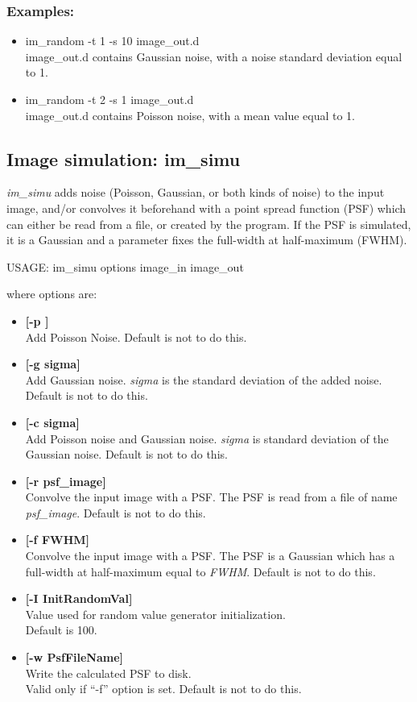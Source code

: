 \subsubsection*{Examples:}
\begin{itemize}
\item im\_random  -t 1 -s 10 image\_out.d  \\
image\_out.d contains Gaussian noise, with a noise standard 
deviation equal to 1.
\item im\_random  -t 2 -s 1 image\_out.d  \\
image\_out.d contains Poisson noise, with a mean value equal to 1.
\end{itemize}

\subsection{Image simulation: im\_simu}

{\em im\_simu} adds noise (Poisson, Gaussian, or both kinds of noise)
to the input image, and/or convolves it beforehand with a 
point spread function (PSF)
which can either be read from a file, or created by the program.
If the PSF is simulated, it is a Gaussian and a parameter fixes the
full-width at half-maximum (FWHM). 
{\bf
\begin{center}
USAGE: im\_simu options image\_in image\_out
\end{center}}
where options are:
\begin{itemize}
\item {\bf[-p ]} \\
Add Poisson Noise. Default is not to do this.
\item{\bf [-g sigma]} \\
Add Gaussian noise. {\em sigma} is the standard 
deviation of the added noise. Default is not to do this.
\item{\bf [-c sigma]} \\
Add Poisson noise and Gaussian noise. 
{\em sigma} is standard deviation of the Gaussian noise. Default is not to do this.
\item{\bf [-r psf\_image]} \\
Convolve the input image with a PSF. The 
PSF is read from a file of name {\em psf\_image}. Default is not to do this.
 \item{\bf [-f FWHM]} \\
Convolve the input image with a PSF. The PSF
is a Gaussian which has a full-width at half-maximum equal 
to {\em FWHM}. Default is not to do this.
\item {\bf [-I InitRandomVal]} \\
Value used for random value generator initialization. \\
Default is 100. 
\item{\bf [-w PsfFileName]} \\
Write the calculated PSF to  disk. \\
 Valid only if ``-f'' option is set.
Default is not to do this.
\end{itemize}

